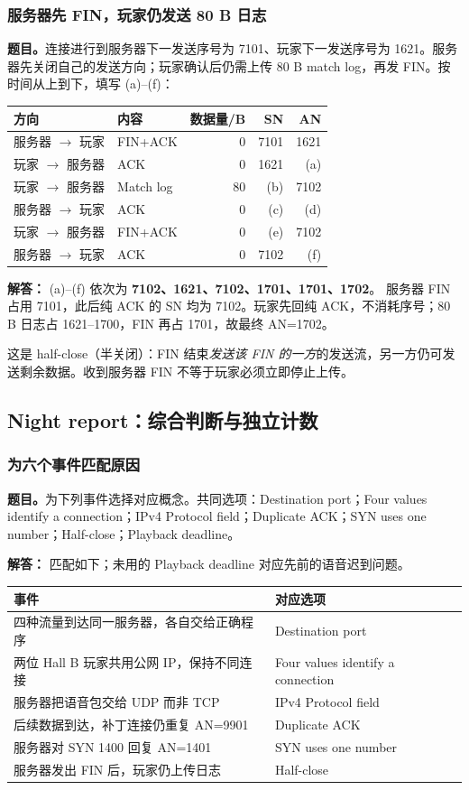 \documentclass[11pt,a4paper,fontset=fandol]{ctexart}
\renewcommand{\exercisequestion}[2]{%
  \Needspace{5\baselineskip}%
  \subsubsection{#2}\label{exercise:#1}%
}
\renewenvironment{checkedsolution}
  {\par\nopagebreak[4]\textbf{解答：}\ignorespaces}
  {\par}
\begin{document}
\exercisequestion{SC2008-HW04-Q13}{服务器先 FIN，玩家仍发送 80 B 日志}
\textbf{题目。}连接进行到服务器下一发送序号为 7101、玩家下一发送序号为 1621。服务器先关闭自己的发送方向；玩家确认后仍需上传 80 B match log，再发 FIN。按时间从上到下，填写 (a)--(f)：
\begin{center}
\small
\begin{tabular}{@{}llrrr@{}}
\toprule
方向 & 内容 & 数据量/B & SN & AN \\
\midrule
服务器 $\to$ 玩家 & FIN+ACK & 0 & 7101 & 1621 \\
玩家 $\to$ 服务器 & ACK & 0 & 1621 & (a) \\
玩家 $\to$ 服务器 & Match log & 80 & (b) & 7102 \\
服务器 $\to$ 玩家 & ACK & 0 & (c) & (d) \\
玩家 $\to$ 服务器 & FIN+ACK & 0 & (e) & 7102 \\
服务器 $\to$ 玩家 & ACK & 0 & 7102 & (f) \\
\bottomrule
\end{tabular}
\end{center}
\begin{checkedsolution}
(a)--(f) 依次为 \textbf{7102、1621、7102、1701、1701、1702}。
服务器 FIN 占用 7101，此后纯 ACK 的 SN 均为 7102。玩家先回纯 ACK，不消耗序号；80 B 日志占 1621--1700，FIN 再占 1701，故最终 AN=1702。

这是 half-close（半关闭）：FIN 结束\emph{发送该 FIN 的一方}的发送流，另一方仍可发送剩余数据。收到服务器 FIN 不等于玩家必须立即停止上传。
\end{checkedsolution}

\subsection{Night report：综合判断与独立计数}

\exercisequestion{SC2008-HW04-Q14}{为六个事件匹配原因}
\textbf{题目。}为下列事件选择对应概念。共同选项：Destination port；Four values identify a connection；IPv4 Protocol field；Duplicate ACK；SYN uses one number；Half-close；Playback deadline。
\begin{checkedsolution}
匹配如下；未用的 Playback deadline 对应先前的语音迟到问题。
\begin{center}
\small
\begin{tabularx}{\textwidth}{@{}Xp{6.0cm}@{}}
\toprule
事件 & 对应选项 \\
\midrule
四种流量到达同一服务器，各自交给正确程序 & Destination port \\
两位 Hall B 玩家共用公网 IP，保持不同连接 & Four values identify a connection \\
服务器把语音包交给 UDP 而非 TCP & IPv4 Protocol field \\
后续数据到达，补丁连接仍重复 AN=9901 & Duplicate ACK \\
服务器对 SYN 1400 回复 AN=1401 & SYN uses one number \\
服务器发出 FIN 后，玩家仍上传日志 & Half-close \\
\bottomrule
\end{tabularx}
\end{center}
\end{checkedsolution}
\end{document}
